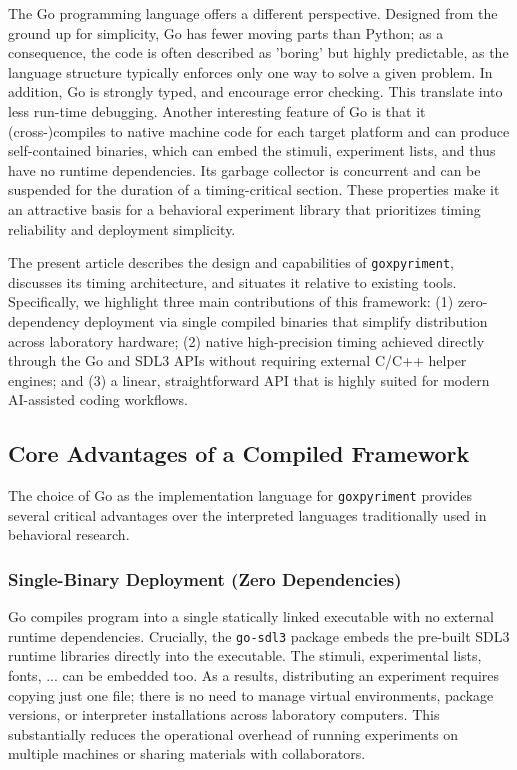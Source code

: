 \documentclass[jou,a4paper]{apa7}
\begin{document}
The Go programming language \parencite{donovan2016} offers a different
perspective. Designed from the ground up for simplicity, Go has fewer
moving parts than Python; as a consequence, the code is often
described as 'boring' but highly predictable, as the language
structure typically enforces only one way to solve a given problem. In
addition, Go is strongly typed, and encourage error checking. This
translate into less run-time debugging. Another interesting feature of
Go is that it (cross-)compiles to native machine code for each target
platform and can produce self-contained binaries, which can embed the
stimuli, experiment lists, and thus have no runtime dependencies. Its
garbage collector is concurrent and can be suspended for the duration
of a timing-critical section.  These properties make it an attractive
basis for a behavioral experiment library that prioritizes timing
reliability and deployment simplicity.

The present article describes the design and capabilities of
\texttt{goxpyriment}, discusses its timing architecture, and situates it
relative to existing tools. Specifically, we highlight three main contributions
of this framework: (1) zero-dependency deployment via single compiled binaries
that simplify distribution across laboratory hardware; (2) native high-precision
timing achieved directly through the Go and SDL3 APIs without requiring external
C/C++ helper engines; and (3) a linear, straightforward API that is highly
suited for modern AI-assisted coding workflows.

\subsection{Core Advantages of a Compiled Framework}\label{core-advantages}

The choice of Go as the implementation language for \texttt{goxpyriment} provides
several critical advantages over the interpreted languages traditionally used in
behavioral research.

\subsubsection{Single-Binary Deployment (Zero Dependencies)}\label{single-binary-deployment}

Go compiles program into a single statically linked executable with no
external runtime dependencies. Crucially, the \texttt{go-sdl3} package
embeds the pre-built SDL3 runtime libraries \parencite{sdl3} directly into the
executable. The stimuli, experimental lists, fonts, ... can be
embedded too. As a results, distributing an experiment requires copying just one
file; there is no need to manage virtual environments, package
versions, or interpreter installations across laboratory
computers. This substantially reduces the operational overhead of
running experiments on multiple machines or sharing materials with
collaborators.
\end{document}
